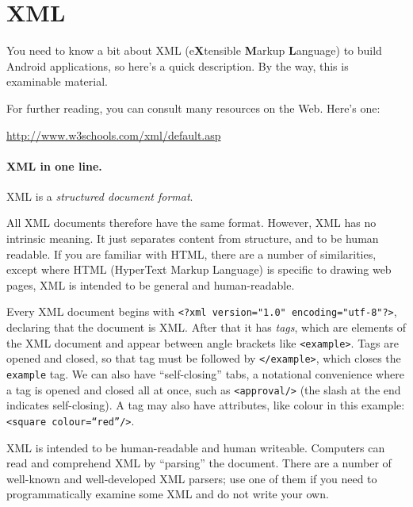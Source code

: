




\section*{XML}
You need to know a bit about
XML (e\textbf{X}tensible \textbf{M}arkup \textbf{L}anguage)  to build Android applications, so here's a quick description.  By
the way, this is examinable material.

For further reading, you can consult many resources on the Web.
Here's one:
\begin{center}
\url{http://www.w3schools.com/xml/default.asp}
\end{center}

\paragraph{XML in one line.}
\begin{center}
XML is a \emph{structured document format}.
\end{center}

All XML documents therefore have the same format. However, XML
has no intrinsic meaning. It just separates content from structure, and to be human readable. If you are familiar with HTML, there are a number of similarities, except where HTML (HyperText Markup Language) is specific to drawing web pages, XML is intended to be general and human-readable.

Every XML document begins with \verb+<?xml version="1.0" encoding="utf-8"?>+, declaring that the document is XML. After that it has \emph{tags}, which are elements of the XML document and appear between angle brackets like \texttt{<example>}. Tags are opened and closed, so that tag must be followed by \texttt{</example>}, which closes the \texttt{example} tag. We can also have ``self-closing'' tabs, a notational convenience where a tag is opened and closed all at once, such as \texttt{<approval/>} (the slash at the end indicates self-closing). A tag may also have attributes, like colour in this example: \texttt{<square colour=``red''/>}.

XML is intended to be human-readable and human writeable. Computers can read and comprehend XML by ``parsing'' the document. There are a number of well-known and well-developed XML parsers; use one of them if you need to programmatically examine some XML and do not write your own.

